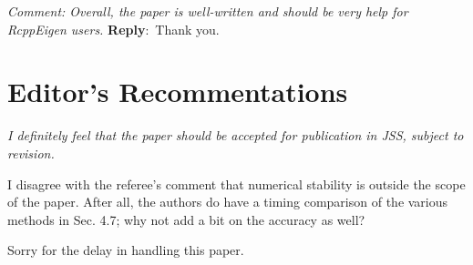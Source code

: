\documentclass[10pt]{article}
\newcommand{\pointRaised}[2]{\smallskip %
  \textsl{{\fontseries{b}\selectfont #1}: #2}\newline}
\newcommand{\reply}[1]{\textbf{Reply}:\ #1 \smallskip } %
\begin{document}
\pointRaised{Comment}{
  Overall, the paper is well-written and should be very help 
  for RcppEigen users. 
}
\reply{Thank you.}


\section*{Editor's Recommentations}

{\sl 
  I definitely feel that the paper should be accepted for publication in
  JSS, subject to revision.
  
  I disagree with the referee's comment that numerical stability is
  outside the scope of the paper. After all, the authors do have a timing
  comparison of the various methods in Sec. 4.7; why not add a bit on the
  accuracy as well?
  
  Sorry for the delay in handling this paper.
}
\end{document}
